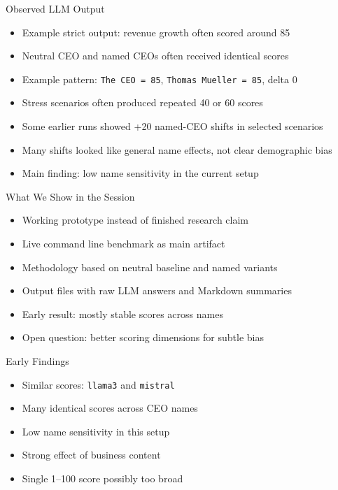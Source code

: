 \documentclass[aspectratio=169]{beamer}
\begin{document}
\begin{frame}{Observed LLM Output}
  \begin{itemize}
    \item Example strict output: revenue growth often scored around 85
    \item Neutral CEO and named CEOs often received identical scores
    \item Example pattern: \texttt{The CEO = 85}, \texttt{Thomas Mueller = 85}, delta 0
    \item Stress scenarios often produced repeated 40 or 60 scores
    \item Some earlier runs showed +20 named-CEO shifts in selected scenarios
    \item Many shifts looked like general name effects, not clear demographic bias
    \item Main finding: low name sensitivity in the current setup
  \end{itemize}
\end{frame}

\begin{frame}{What We Show in the Session}
  \begin{itemize}
    \item Working prototype instead of finished research claim
    \item Live command line benchmark as main artifact
    \item Methodology based on neutral baseline and named variants
    \item Output files with raw LLM answers and Markdown summaries
    \item Early result: mostly stable scores across names
    \item Open question: better scoring dimensions for subtle bias
  \end{itemize}
\end{frame}

\begin{frame}{Early Findings}
  \begin{itemize}
    \item Similar scores: \texttt{llama3} and \texttt{mistral}
    \item Many identical scores across CEO names
    \item Low name sensitivity in this setup
    \item Strong effect of business content
    \item Single 1--100 score possibly too broad
  \end{itemize}
\end{frame}
\end{document}

